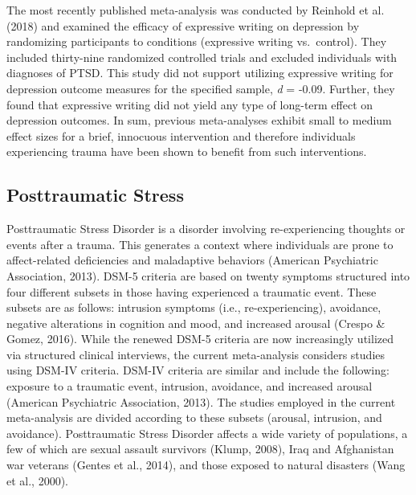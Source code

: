 \documentclass[man, mask]{apa6}
\theoremstyle{definition}
\theoremstyle{definition}
\theoremstyle{definition}
\theoremstyle{remark}
\begin{document}
The most recently published meta-analysis was conducted by Reinhold et
al. (2018) and examined the efficacy of expressive writing on depression
by randomizing participants to conditions (expressive writing
vs.~control). They included thirty-nine randomized controlled trials and
excluded individuals with diagnoses of PTSD. This study did not support
utilizing expressive writing for depression outcome measures for the
specified sample, \emph{d} = -0.09. Further, they found that expressive
writing did not yield any type of long-term effect on depression
outcomes. In sum, previous meta-analyses exhibit small to medium effect
sizes for a brief, innocuous intervention and therefore individuals
experiencing trauma have been shown to benefit from such interventions.

\subsection{Posttraumatic Stress}\label{posttraumatic-stress}

Posttraumatic Stress Disorder is a disorder involving re-experiencing
thoughts or events after a trauma. This generates a context where
individuals are prone to affect-related deficiencies and maladaptive
behaviors (American Psychiatric Association, 2013). DSM-5 criteria are
based on twenty symptoms structured into four different subsets in those
having experienced a traumatic event. These subsets are as follows:
intrusion symptoms (i.e., re-experiencing), avoidance, negative
alterations in cognition and mood, and increased arousal (Crespo \&
Gomez, 2016). While the renewed DSM-5 criteria are now increasingly
utilized via structured clinical interviews, the current meta-analysis
considers studies using DSM-IV criteria. DSM-IV criteria are similar and
include the following: exposure to a traumatic event, intrusion,
avoidance, and increased arousal (American Psychiatric Association,
2013). The studies employed in the current meta-analysis are divided
according to these subsets (arousal, intrusion, and avoidance).
Posttraumatic Stress Disorder affects a wide variety of populations, a
few of which are sexual assault survivors (Klump, 2008), Iraq and
Afghanistan war veterans (Gentes et al., 2014), and those exposed to
natural disasters (Wang et al., 2000).
\end{document}
